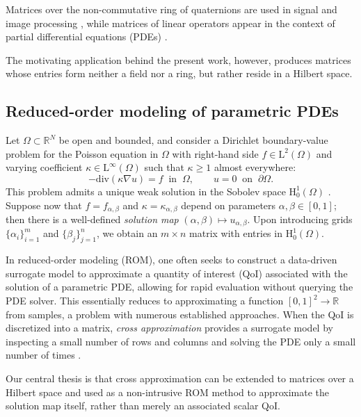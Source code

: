\documentclass[onefignum,onetabnum]{siamart250211}
\renewenvironment{equation*}{\[}{\]\ignorespacesafterend}
\newcommand{\Real}{\mathbb{R}}
\newcommand{\Hilb}{\mathrm{H}}
\newcommand{\Ell}{\mathrm{L}}
\begin{document}
Matrices over the non-commutative ring of quaternions \cite{zhang1997quaternions} are used in signal and image processing \cite{miron2006quaternion, jia2019robust, miron2023quaternions}, while matrices of linear operators appear in the context of partial differential equations (PDEs) \cite{tretter2008spectral, barbarino2020block}.

The motivating application behind the present work, however, produces matrices whose entries form neither a field nor a ring, but rather reside in a Hilbert space.

\subsection{Reduced-order modeling of parametric PDEs}
\label{sec:intro:rom}
Let $\Omega \subset \Real^{N}$ be open and bounded, and consider a Dirichlet boundary-value problem for the Poisson equation in $\Omega$ with right-hand side $f \in \Ell^2(\Omega)$ and varying coefficient $\kappa \in \Ell^\infty(\Omega)$ such that $\kappa \geq 1$ almost everywhere:
\begin{equation*}
    -\mathrm{div}(\kappa \nabla u) = f~\text{ in }~\Omega, \qquad u = 0~\text{ on }~\partial\Omega.
\end{equation*}
This problem admits a unique weak solution in the Sobolev space $\Hilb^{1}_0(\Omega)$ \cite[Ch.~9]{brezis2011functional}.
Suppose now that $f = f_{\alpha,\beta}$ and $\kappa = \kappa_{\alpha,\beta}$ depend on parameters $\alpha,\beta \in [0,1]$; then there is a well-defined \emph{solution map} $(\alpha, \beta) \mapsto u_{\alpha,\beta}$.
Upon introducing grids $\{ \alpha_i \}_{i = 1}^{m}$ and $\{ \beta_j \}_{j = 1}^{n}$, we obtain an $m \times n$ matrix with entries in $\Hilb^{1}_0(\Omega)$.

In reduced-order modeling (ROM), one often seeks to construct a data-driven surrogate model to approximate a quantity of interest (QoI) associated with the solution of a parametric PDE, allowing for rapid evaluation without querying the PDE solver.
This essentially reduces to approximating a function $[0,1]^2 \to \Real$ from samples, a problem with numerous established approaches.
When the QoI is discretized into a matrix, \emph{cross approximation} \cite{goreinov1997theory, bebendorf2000approximation} provides a surrogate model by inspecting a small number of rows and columns and solving the PDE only a small number of times \cite{ballani2015hierarchical}.

Our central thesis is that cross approximation can be extended to matrices over a Hilbert space and used as a non-intrusive ROM method to approximate the solution map itself, rather than merely an associated scalar QoI.
\end{document}
